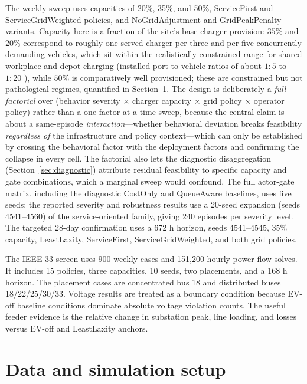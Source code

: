 \documentclass[12pt]{article}
\begin{document}
The weekly sweep uses capacities of 20\%, 35\%, and 50\%, ServiceFirst and ServiceGridWeighted policies, and NoGridAdjustment and GridPeakPenalty variants. Capacity here is a fraction of the site's base charger provision: $35\%$ and $20\%$ correspond to roughly one served charger per three and per five concurrently demanding vehicles, which sit within the realistically constrained range for shared workplace and depot charging (installed port-to-vehicle ratios of about $1{:}5$ to $1{:}20$ \cite{muratori2018,powell2022}), while $50\%$ is comparatively well provisioned; these are constrained but not pathological regimes, quantified in Section~\ref{sec:data}. The design is deliberately a \emph{full factorial} over (behavior severity $\times$ charger capacity $\times$ grid policy $\times$ operator policy) rather than a one-factor-at-a-time sweep, because the central claim is about a same-episode \emph{interaction}---whether behavioral deviation breaks feasibility \emph{regardless of} the infrastructure and policy context---which can only be established by crossing the behavioral factor with the deployment factors and confirming the collapse in every cell. The factorial also lets the diagnostic disaggregation (Section~\ref{sec:diagnostic}) attribute residual feasibility to specific capacity and gate combinations, which a marginal sweep would confound. The full actor-gate matrix, including the diagnostic CostOnly and QueueAware baselines, uses five seeds; the reported severity and robustness results use a 20-seed expansion (seeds 4541--4560) of the service-oriented family, giving 240 episodes per severity level. The targeted 28-day confirmation uses a 672 h horizon, seeds 4541--4545, 35\% capacity, LeastLaxity, ServiceFirst, ServiceGridWeighted, and both grid policies.

The IEEE-33 screen uses 900 weekly cases and 151,200 hourly power-flow solves. It includes 15 policies, three capacities, 10 seeds, two placements, and a 168 h horizon. The placement cases are concentrated bus 18 and distributed buses 18/22/25/30/33. Voltage results are treated as a boundary condition because EV-off baseline conditions dominate absolute voltage violation counts. The useful feeder evidence is the relative change in substation peak, line loading, and losses versus EV-off and LeastLaxity anchors.

\section{Data and simulation setup}\label{sec:data}
\end{document}
